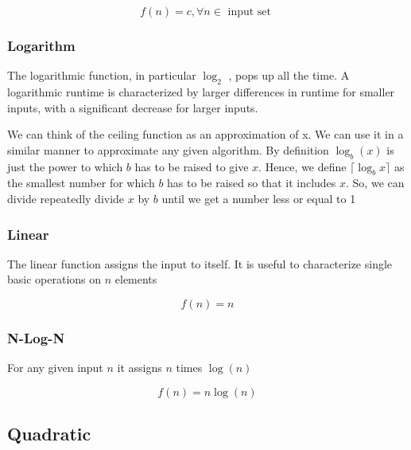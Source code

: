 	$$f(n) = c , \forall n \in \text{ input set }$$


\subsubsection{Logarithm}

	\par{The logarithmic function, in particular $\log_2$ , pops up all the
	time. A logarithmic runtime is characterized by larger differences in
	runtime for smaller inputs, with a significant decrease for larger inputs.}



	\par{We can think of the ceiling function as an approximation of x. We can
			use it in a similar manner to approximate any given algorithm. By
			definition $\log_b(x)$ is just the power to which $b$ has to be
			raised to give $x$. Hence, we define $\lceil\log_b x\rceil$ as the
	smallest number for which $b$ has to be raised so that it includes $x$. So,
	we can divide repeatedly divide $x$ by $b$ until we get a number less or
	equal to 1}


\subsubsection{Linear}

	\par{The linear function assigns the input to itself. It is useful to
	characterize single basic operations on $n$ elements}

	$$f(n) = n$$

\subsubsection{N-Log-N}

	\par{For any given input $n$ it assigns $n$ times $\log(n)$}

	$$f(n) = n\log(n)$$

\subsection{Quadratic}

